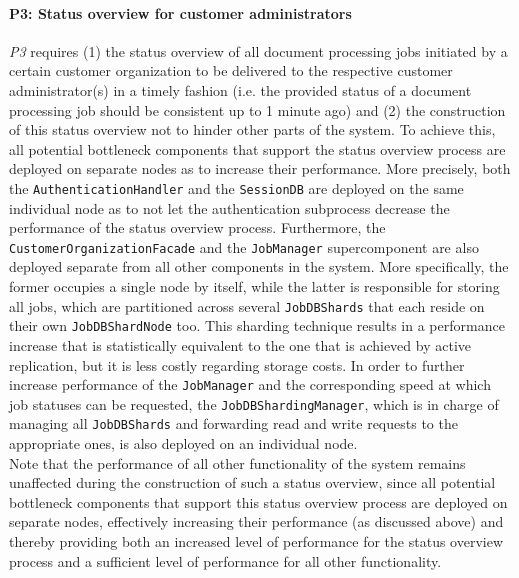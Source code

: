 \documentclass[a4paper,10pt]{article}
\begin{document}
\paragraph{P3: Status overview for customer administrators}
\textit{P3} requires (1) the status overview of all document processing jobs initiated by a certain customer organization to be delivered to the respective customer administrator(s) in a timely fashion (i.e. the provided status of a document processing job should be consistent up to 1 minute ago) and (2) the construction of this status overview not to hinder other parts of the system. To achieve this, all potential bottleneck components that support the status overview process are deployed on separate nodes as to increase their performance. More precisely, both the \texttt{AuthenticationHandler} and the \texttt{SessionDB} are deployed on the same individual node as to not let the authentication subprocess decrease the performance of the status overview process. Furthermore, the \texttt{CustomerOrganizationFacade} and the \texttt{JobManager} supercomponent are also deployed separate from all other components in the system. More specifically, the former occupies a single node by itself, while the latter is responsible for storing all jobs, which are partitioned across several \texttt{JobDBShards} that each reside on their own \texttt{JobDBShardNode} too. This sharding technique results in a performance increase that is statistically equivalent to the one that is achieved by active replication, but it is less costly regarding storage costs. In order to further increase performance of the \texttt{JobManager} and the corresponding speed at which job statuses can be requested, the \texttt{JobDBShardingManager}, which is in charge of managing all \texttt{JobDBShards} and forwarding read and write requests to the appropriate ones, is also deployed on an individual node.\\
Note that the performance of all other functionality of the system remains unaffected during the construction of such a status overview, since all potential bottleneck components that support this status overview process are deployed on separate nodes, effectively increasing their performance (as discussed above) and thereby providing both an increased level of performance for the status overview process and a sufficient level of performance for all other functionality.\\
\end{document}
